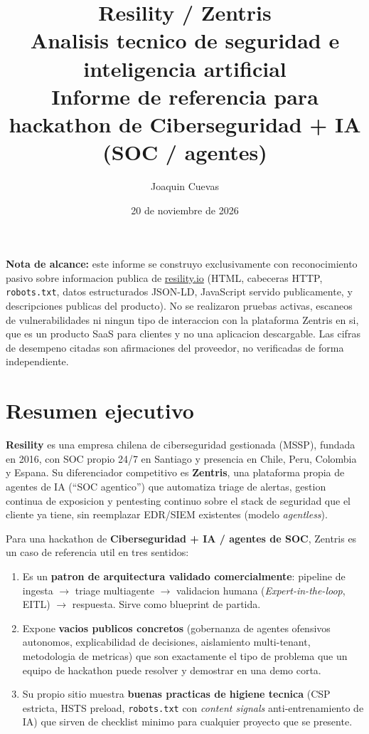 \documentclass[11pt,a4paper]{article}
\title{\color{brandblue}\textbf{Resility / Zentris}\\[0.3em]
\Large Analisis tecnico de seguridad e inteligencia artificial\\[0.2em]
\large Informe de referencia para hackathon de Ciberseguridad + IA (SOC / agentes)}
\author{Joaquin Cuevas}
\date{20 de noviembre de 2026}
\begin{document}
\maketitle
\thispagestyle{fancy}

\begin{center}
\colorbox{tablehead}{\parbox{0.92\textwidth}{\small
\textbf{Nota de alcance:} este informe se construyo exclusivamente con reconocimiento
pasivo sobre informacion publica de \url{resility.io} (HTML, cabeceras HTTP, \texttt{robots.txt},
datos estructurados JSON-LD, JavaScript servido publicamente, y descripciones publicas del
producto). No se realizaron pruebas activas, escaneos de vulnerabilidades ni ningun tipo de
interaccion con la plataforma Zentris en si, que es un producto SaaS para clientes y no una
aplicacion descargable. Las cifras de desempeno citadas son afirmaciones del proveedor, no
verificadas de forma independiente.}}
\end{center}

\vspace{0.5em}
\tableofcontents
\vspace{1em}

\section{Resumen ejecutivo}

\textbf{Resility} es una empresa chilena de ciberseguridad gestionada (MSSP), fundada en 2016,
con SOC propio 24/7 en Santiago y presencia en Chile, Peru, Colombia y Espana. Su diferenciador
competitivo es \textbf{Zentris}, una plataforma propia de agentes de IA (``SOC agentico'') que
automatiza triage de alertas, gestion continua de exposicion y pentesting continuo sobre el
stack de seguridad que el cliente ya tiene, sin reemplazar EDR/SIEM existentes (modelo
\emph{agentless}).

Para una hackathon de \textbf{Ciberseguridad + IA / agentes de SOC}, Zentris es un caso de
referencia util en tres sentidos:

\begin{enumerate}[leftmargin=1.4em]
  \item Es un \textbf{patron de arquitectura validado comercialmente}: pipeline de ingesta
  $\rightarrow$ triage multiagente $\rightarrow$ validacion humana (\emph{Expert-in-the-loop},
  EITL) $\rightarrow$ respuesta. Sirve como blueprint de partida.
  \item Expone \textbf{vacios publicos concretos} (gobernanza de agentes ofensivos autonomos,
  explicabilidad de decisiones, aislamiento multi-tenant, metodologia de metricas) que son
  exactamente el tipo de problema que un equipo de hackathon puede resolver y demostrar en
  una demo corta.
  \item Su propio sitio muestra \textbf{buenas practicas de higiene tecnica} (CSP estricta,
  HSTS preload, \texttt{robots.txt} con \emph{content signals} anti-entrenamiento de IA) que
  sirven de checklist minimo para cualquier proyecto que se presente.
\end{enumerate}
\end{document}
